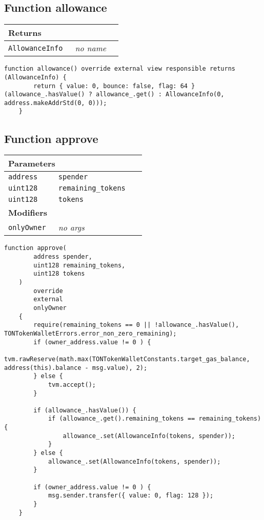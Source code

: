\subsection{Function allowance}


\ifsoltables
\noindent\begin{tabular}{|l|l|p{5cm}|}\hline
\multicolumn{3}{|l|}{\bf Returns}\\\hline
\tt AllowanceInfo & {\em no name} &\\\hline
\end{tabular}
\fi

\vspace{2cm}

\begin{lstlisting}[firstnumber=107]
    function allowance() override external view responsible returns (AllowanceInfo) {
        return { value: 0, bounce: false, flag: 64 } (allowance_.hasValue() ? allowance_.get() : AllowanceInfo(0, address.makeAddrStd(0, 0)));
    }
\end{lstlisting}

\subsection{Function approve}


\ifsoltables
\noindent\begin{tabular}{|l|l|p{5cm}|}\hline
\multicolumn{3}{|l|}{\bf Parameters}\\\hline
\tt address & \tt spender &\\\hline
\tt uint128 & \tt remaining\_{}tokens &\\\hline
\tt uint128 & \tt tokens &\\\hline
\multicolumn{3}{|l|}{\bf Modifiers}\\\hline
\tt onlyOwner & {\em no args} &\\\hline
\end{tabular}
\fi

\vspace{2cm}

\begin{lstlisting}[firstnumber=119]
    function approve(
        address spender,
        uint128 remaining_tokens,
        uint128 tokens
    )
        override
        external
        onlyOwner
    {
        require(remaining_tokens == 0 || !allowance_.hasValue(), TONTokenWalletErrors.error_non_zero_remaining);
        if (owner_address.value != 0 ) {
            tvm.rawReserve(math.max(TONTokenWalletConstants.target_gas_balance, address(this).balance - msg.value), 2);
        } else {
            tvm.accept();
        }

        if (allowance_.hasValue()) {
            if (allowance_.get().remaining_tokens == remaining_tokens) {
                allowance_.set(AllowanceInfo(tokens, spender));
            }
        } else {
            allowance_.set(AllowanceInfo(tokens, spender));
        }

        if (owner_address.value != 0 ) {
            msg.sender.transfer({ value: 0, flag: 128 });
        }
    }
\end{lstlisting}

